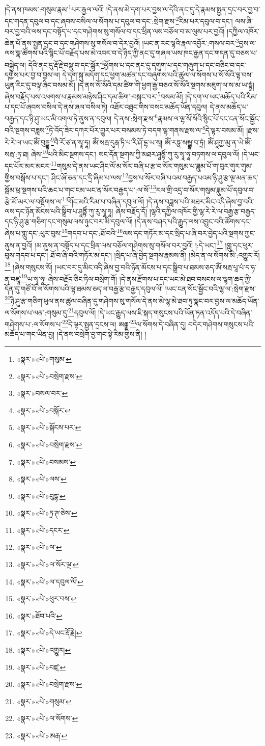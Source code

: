 །དེ་ནས་ཁམས་:གསུམ་རྣམ་\footnote{«སྣར་»«པེ་»གསུམ་}པར་རྒྱལ་ལའོ། །དེ་ནས་མེ་དག་པར་བྱས་ལ་དེའི་ནང་དུ་དེ་རྣམས་སྤྱན་དྲང་བར་བྱ་བ་དང་གདན་དབུལ་བ་དང་ཞབས་བསིལ་ལ་སོགས་པ་དབུལ་བ་དང་:སྲེག་རྫས་\footnote{«སྣར་»«པེ་»བསྲེག་རྫས་}རིམ་པར་དབུལ་བ་དང་། ལས་ཞི་བར་བྱ་བའི་ལས་དང་བསྟོད་པ་དང་གཤེགས་སུ་གསོལ་བ་དང་ཕྲིན་ལས་བཅོལ་བ་མ་ལུས་པར་བྱའོ། །དཀྱིལ་འཁོར་ཆེན་པོ་ནས་སྤྱན་དྲང་བ་དང་གཤེགས་སུ་གསོལ་བ་དེར་བྱའོ། །ཡང་ན་རང་ལྷའི་རྣལ་འབྱོར་:གསལ་བར་\footnote{«སྣར་»བསལ་བར་}བྱས་ལ་ལས་སྣ་ཚོགས་པའི་སྙིང་པོ་བརྗོད་པས་མེ་འབར་བ་དེ་ཉིད་ཀྱི་ནང་དུ་གཞལ་ཡས་ཁང་རྒྱན་དང་གདན་དུ་བཅས་པ་བསྐྱེད་ལ། དེའི་ནང་དུ་རྡོ་རྗེ་བསྡུ་བ་དང་སྒོར་\footnote{«སྣར་»«པེ་»བསྐོར་}ཕྱོགས་པ་དང་ནང་དུ་དགུག་པ་དང་གཞུག་པ་དང་བཅིང་བ་དང་དགྱེས་པར་བྱ་བ་བྱས་ལ། དེ་དག་སྐུ་མདོག་དང་ཕྱག་མཚན་དང་བཞུགས་པའི་ཚུལ་ལ་སོགས་པ་སོ་སོའི་ལྟ་བས་ཡུན་རིང་དུ་བལྟ་ཞིང་བསམ་མོ། །དེ་ནས་སོ་སོའི་དམ་ཚིག་གི་ཕྱག་རྒྱ་བཅའ་སོ་སོའི་སྔགས་མཇུག་ལ་ས་མ་ཡ་སྟྭཾ། ཞེས་བརྗོད་པས་འཕགས་པ་རྣམས་མཉེས་ཤིང་དམ་ཚིག་:བསྐང་བར་\footnote{«སྣར་»«པེ་»སྐོངས་པར་}བསམ་མོ། །དེ་དག་ལ་ཡང་མཆོད་པའི་རིམ་པ་དང་པོ་ཞབས་བསིལ་དེ་ནས་ཞལ་བསིལ་ཏེ། འཐོར་འཐུང་གིས་བསང་མཆོད་ཡོན་དབུལ། དེ་ནས་མཆོད་པ་བརྒྱད་དང་ཉི་ཤུ་ཡང་མི་འགལ་ཏེ་ནུས་ན་དབུལ། དེ་ནས་:སྲེག་རྫས་\footnote{«སྣར་»«པེ་»བསྲེག་རྫས་}རྣམས་ལ་ལྷ་སོ་སོའི་སྙིང་པོ་དང་ངན་སོང་སྦྱོང་བའི་སྔགས་བཟླས་\footnote{«སྣར་»«པེ་»བསམས་}ཏེ་འོད་ཟེར་དཀར་པོར་གྱུར་པར་བསམས་ཏེ་བདག་ལྷ་གནས་རྫས་ལ་\footnote{«སྣར་»«པེ་»ལས་}དེ་ལྟར་བསམ་མོ། །རྫས་རེ་རེ་ལ་ཡང་ཨོཾ་བུདྡྷ་\footnote{«སྣར་»«པེ་»བུདྷ་}བཻ་རོ་ཙ་ན་སྭཱ་ཧཱ། ཨོཾ་སརྦ་དུརྒ་ཏི་པ་རི་ཤོ་དྷ་ཡ་སྭ། ཨོཾ་རཏྣ་སམྦྷ་བ་ཏྲཾ། ཨོཾ་ཤཱཀྱ་མུ་ན་ཡེ་ཨོཾ་སརྦ་:ཏྲ་ཐ། ཞེས་\footnote{«སྣར་»«པེ་»ཏྲ་ཊ་ཅེས་}པའི་མིང་སྔགས་དང་། སང་དོན་སྔགས་ཀྱི་མཐར་ཤཱནྟིཾ་ཀུ་རུ་སྭཱ་ཧཱ་བཏགས་ལ་དབུལ་ལོ། །དེ་ཡང་དང་པོར་མར་མངར་\footnote{«སྣར་»«པེ་»དངར་}གསུམ་དེ་ནས་ཡང་ཤིང་ལོ་མ་སོར་བཞི་པ་རྩ་བ་སོར་གསུམ་པ་ཟླུམ་པོ་ག་བུར་གུར་གུམ་གྱིས་བསྒོས་པ་དང་། ཤིང་ཞོ་ཅན་དང་དྲི་ཞིམ་པ་ལས་\footnote{«སྣར་»«པེ་»ལ་}བྱས་པ་སོར་བཞི་པའམ་བརྒྱད་པའམ་ཉི་ཤུ་རྩ་ལྔ་མན་ཆད་སྦོམ་ཕྲ་སྔགས་པའི་ཆང་པ་གང་ངམ་ཡང་ན་སོར་བརྒྱད་པ་:ལ་སོ་\footnote{«སྣར་»«པེ་»ལ་སོར་ལྔ་}རལ་གྲི་འདྲ་བ་སོར་གསུམ་ཟླུམ་པོ་དབུལ་བ་རྩེ་མོ་མར་ལ་བསྡོགས་ལ་\footnote{«སྣར་»«པེ་»ལ་དབུལ་ལོ་}གོང་མའི་རིམ་པ་བཞིན་དབུལ་ལོ། །དེ་ནས་བཟླས་པའི་མཐར་མིང་འདི་ཞེས་བྱ་བའི་ལས་དང་ཉོན་མོངས་པའི་སྒྲིབ་པ་ཤཱནྟིཾ་ཀུ་རུ་སྭཱ་ཧཱ། ཞེས་བརྗོད་དོ། །ལྷའི་དཀྱིལ་འཁོར་གྱི་ལྷ་རེ་རེ་ལ་བརྒྱ་རྩ་བརྒྱད་དང་ཉི་ཤུ་རྩ་གཅིག་དང་གསུམ་ལས་ཉུང་བར་མི་དབུལ་ལོ། །དེ་ནས་བཤད་པའི་རྒྱུད་ལས་འབྱུང་བའི་ཚོགས་དང་ཞེས་པ་གླུ་དང་:ཕུར་བུས་\footnote{«སྣར་»«པེ་»ཕུར་བས་}གདབ་པ་དང་:ཐོ་བའི་\footnote{«སྣར་»ཐོབ་པའི་}ལས་དང་གཏོར་མ་དང་སྲིད་པ་ཞི་བར་བྱེད་པའི་སྔགས་ཀྱང་ནུས་ན་བྱའོ། །མ་ནུས་ན་བསྟོད་པ་དང་ཕྲིན་ལས་བཅོལ་གཤེགས་སུ་གསོལ་བར་བྱའོ། །:དེ་ཡང་།\footnote{«སྣར་»«པེ་»དེ་ཡང་རྡོ་རྗེ།} །གླུ་དང་ཕུར་བུས་གདབ་པ་དང་། ཐོ་བ་ཞི་བའི་གཏོར་མ་དང་། །སྲིད་པ་ཞི་བྱེད་སྔགས་རྣམས་ནི། །མེད་ན་ལ་སོགས་མི་:འགྱུར་རོ།\footnote{«སྣར་»«པེ་»འགྱུར།} །ཞེས་གསུངས་སོ། །ཡང་བར་དུ་མིང་འདི་ཞེས་བྱ་བའི་ཉོན་མོངས་པ་དང་སྒྲིབ་པ་ཐམས་ཅད་ཨོཾ་སརྦ་པཱ་པཾ་ད་ཧ་ན་བཛྲཱ་\footnote{«སྣར་»«པེ་»བཛྲ་}ཡ་སྭཱ་ཧཱ། ཞེས་བརྗོད་ཅིང་ཏིལ་བསྲེག་གོ། །དེ་ནས་རྫོགས་པ་དང་ཡང་མེ་ཐབ་བསངས་ལ་ལྷག་ཆད་ཀྱི་དོན་དུ་གཙོ་བོ་ལ་སོགས་པའི་ལྷ་ཐམས་ཅད་ལ་བརྒྱ་རྩ་བརྒྱད་དབུལ་ལོ། །ཡང་ངན་སོང་སྦྱོང་བའི་ལྷ་ལ་:སྲེག་རྫས་\footnote{«སྣར་»«པེ་»བསྲེག་རྫས་}ཉི་ཤུ་རྩ་གཅིག་ཕུལ་ནས་ཚུལ་བཞིན་དུ་གཤེགས་སུ་གསོལ་དེ་ནས་མེ་ལྷ་མེ་ཐབ་ཏུ་སྣང་བར་བྱས་ལ་མཆོད་ཡོན་ལ་སོགས་པ་ལན་:གསུམ་དུ་\footnote{«སྣར་»«པེ་»གསུམ་}དབུལ་ལོ། །དེ་ཡང་རྒྱུད་ལས་ཇི་སྐད་གསུངས་པའི་ཡོན་ཏན་འདོད་པའི་དེ་བཞིན་གཤེགས་པ་:ལ་སོགས་པ་\footnote{«སྣར་»«པེ་»ལ་སོགས་}དེ་ལྟར་སྤྱན་དྲངས་ལ། ཨརྒྷ་\footnote{«སྣར་»«པེ་»ཨརྒ་}ལ་སོགས་དེ་བཞིན་དུ། བདེར་གཤེགས་གསུངས་པའི་མཆོད་པ་གང་ཡིན་བྱ། །དེ་ནས་བསྲེག་བྱ་གང་སྟེ་རིམ་གྱིས་ནི། །
